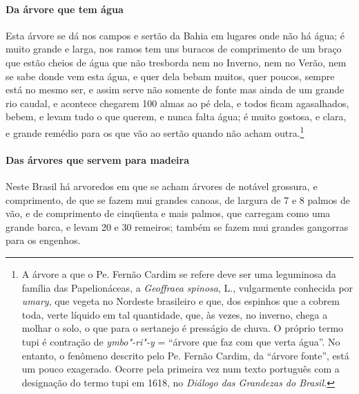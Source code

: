 \paragraph{Da árvore que tem água}

Esta árvore se dá nos campos e sertão da Bahia em lugares
onde não há água; é muito grande e larga, nos ramos tem uns buracos de
comprimento de um braço que estão cheios de água que não tresborda nem
no Inverno, nem no Verão, nem se sabe donde vem esta água, e quer dela
bebam muitos, quer poucos, sempre está no mesmo ser, e assim serve
não somente de fonte mas ainda de um grande rio caudal, e acontece
chegarem 100 almas ao pé dela, e todos ficam agasalhados, bebem, e
levam tudo o que querem, e nunca falta água; é muito gostosa, e clara,
e grande remédio para os que vão ao sertão quando não acham
outra.\footnote{ A árvore a que o Pe. Fernão Cardim se refere deve ser
uma leguminosa da família das Papelionáceas, a \textit{Geoffraea
spinosa}, L., vulgarmente conhecida por \textit{umary}, que vegeta no
Nordeste brasileiro e que, dos espinhos que a cobrem toda, verte
líquido em tal quantidade, que, às vezes, no inverno, chega a molhar o
solo, o que para o sertanejo é presságio de chuva. O próprio termo tupi
é contração de \textit{ymbo"-ri"-y} = ``árvore que faz com que verta
água''. No entanto, o fenômeno descrito pelo Pe. Fernão Cardim, da
``árvore fonte'', está um pouco exagerado. Ocorre pela primeira vez num
texto português com a designação do termo tupi em 1618, no
\textit{Diálogo das Grandezas do Brasil.}} 


\paragraph{Das árvores que servem para madeira}

Neste Brasil há arvoredos em que se acham árvores de notável
grossura, e comprimento, de que se fazem mui grandes canoas, de largura
de 7 e 8 palmos de vão, e de comprimento de cinqüenta e mais palmos,
que carregam como uma grande barca, e levam 20 e 30 remeiros; também se
fazem mui grandes gangorras para os engenhos.

